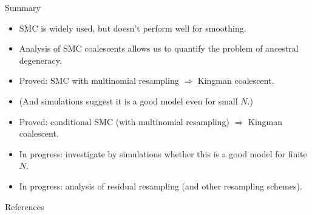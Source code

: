 \documentclass[aspectratio=169]{beamer}
\theoremstyle{definition}
\begin{document}
\begin{frame}{Summary}
\begin{itemize}
\item SMC is widely used, but doesn't perform well for smoothing.
\pause
\item Analysis of SMC coalescents allows us to quantify the problem of ancestral degeneracy.
\pause
\item Proved: SMC with multinomial resampling $\Rightarrow$ Kingman coalescent.
\item (And simulations suggest it is a good model even for small $N$.)
\pause
\item Proved: conditional SMC (with multinomial resampling) $\Rightarrow$ Kingman coalescent.
\item In progress: investigate by simulations whether this is a good model for finite $N$.
\pause
\item In progress: analysis of residual resampling (and other resampling schemes).
\end{itemize}
\end{frame}

\begin{frame}[allowframebreaks]{References}

{\small 

}
\end{frame}
\end{document}
